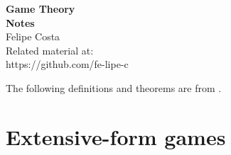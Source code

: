 \documentclass[12pt]{article}
\newcommand{\DOI}{https://github.com/fe-lipe-c}
\begin{document}
\begin{titlepage}
	\begin{flushright}
		\LARGE{\textbf{Game Theory}}\\
		\vfill
		\Huge{\textbf{Notes}}\\
		\vfill
		\large Felipe Costa\\
		\vfill
		\normalsize Related material at:\\
		\DOI
		\vfill
	\end{flushright}
\end{titlepage}

\begin{center}
	\tableofcontents
\end{center}

\pagebreak

The following definitions and theorems are from \cite{maschler_solan_zamir_2020}.


\section{Extensive-form games}


\printbibliography
% 
% 
\end{document}
